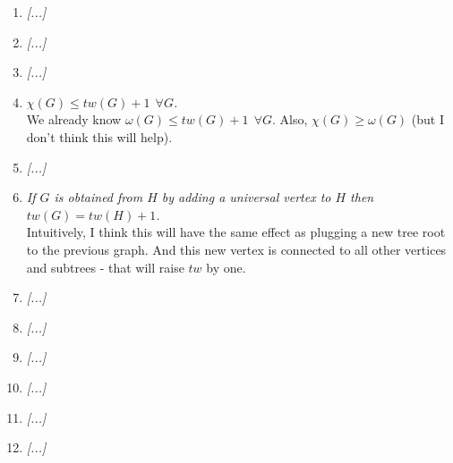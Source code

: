 \documentclass[a4paper,10pt]{article}
\begin{document}
\begin{enumerate}
	\item \textit{[...]}
	\item \textit{[...]}
	\item \textit{[...]}
	\item \textit{$\chi (G) \leq tw(G) +  1~~ \forall G$.\\}
		We already know $\omega(G) \leq tw(G) + 1~~ \forall G$. Also, $\chi(G) \geq \omega(G)$ (but I don't think this will help). 
	\item \textit{[...]}
	\item \textit{If $G$ is obtained from $H$ by adding a universal vertex to $H$ then $tw(G) = tw(H) + 1$.\\}
	Intuitively, I think this will have the same effect as plugging a new tree root to the previous graph. And this new vertex is connected to all other vertices and subtrees - that will raise $tw$ by one.
	\item \textit{[...]}
	\item \textit{[...]}
	\item \textit{[...]}
	\item \textit{[...]}
	\item \textit{[...]}
	\item \textit{[...]}
	
\end{enumerate}
\end{document}

